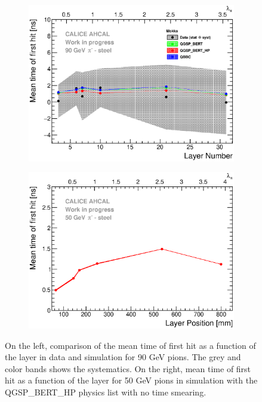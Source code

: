 \begin{figure}[htbp!]
	\begin{subfigure}[t]{0.49\textwidth}
		\centering
		\includegraphics[width=1\textwidth]{../Thesis_Plots/Timing/Pions/Plots/ComparisonToSim/Time_Depth_90GeV_Mokka.eps}
		\caption{} \label{fig:Depth_SimData_Comparison}
	\end{subfigure}
	\hfill
	\begin{subfigure}[t]{0.49\textwidth}
		\centering
		\includegraphics[width=1\textwidth]{../Thesis_Plots/Timing/Pions/Plots/Time_Depth_50GeV_QGSP_BERT_HP_noSmearing.eps}
		\caption{}\label{fig:Depth_Sim_noSmearing}
	\end{subfigure}
	\caption{On the left, comparison of the mean time of first hit as a function of the layer in data and \mokka simulation for 90 GeV pions. The grey and color bands shows the systematics. On the right, mean time of first hit as a function of the layer for 50 GeV pions in simulation with the QGSP\_BERT\_HP physics list with no time smearing.}
\end{figure}

